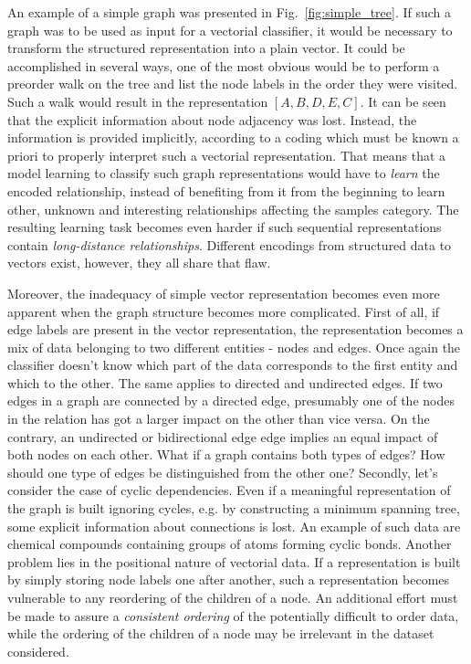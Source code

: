 An example of a simple graph was presented in Fig.~\ref{fig:simple_tree}. If such a graph was to be used as input for a vectorial classifier, it would be necessary to transform the structured representation into a plain vector. It could be accomplished in several ways, one of the most obvious would be to perform a preorder walk on the tree and list the node labels in the order they were visited. Such a walk would result in the representation $[A,B,D,E,C]$. It can be seen that the explicit information about node adjacency was lost. Instead, the information is provided implicitly, according to a coding which must be known a priori to properly interpret such a vectorial representation. That means that a model learning to classify such graph representations would have to \emph{learn} the encoded relationship, instead of benefiting from it from the beginning to learn other, unknown and interesting relationships affecting the samples category. The resulting learning task becomes even harder if such sequential representations contain \emph{long-distance relationships}. Different encodings from structured data to vectors exist, however, they all share that flaw.

Moreover, the inadequacy of simple vector representation becomes even more apparent when the graph structure becomes more complicated. First of all, if edge labels are present in the vector representation, the representation becomes a mix of data belonging to two different entities - nodes and edges. Once again the classifier doesn't know which part of the data corresponds to the first entity and which to the other. The same applies to directed and undirected edges. If two edges in a graph are connected by a directed edge, presumably one of the nodes in the relation has got a larger impact on the other than vice versa. On the contrary, an undirected or bidirectional edge edge implies an equal impact of both nodes on each other. What if a graph contains both types of edges? How should one type of edges be distinguished from the other one? Secondly, let's consider the case of cyclic dependencies. Even if a meaningful representation of the graph is built ignoring cycles, e.g. by constructing a minimum spanning tree, some explicit information about connections is lost. An example of such data are chemical compounds containing groups of atoms forming cyclic bonds. Another problem lies in the positional nature of vectorial data. If a representation is built by simply storing node labels one after another, such a representation becomes vulnerable to any reordering of the children of a node. An additional effort must be made to assure a \emph{consistent ordering} of the potentially difficult to order data, while the ordering of the children of a node may be irrelevant in the dataset considered.

